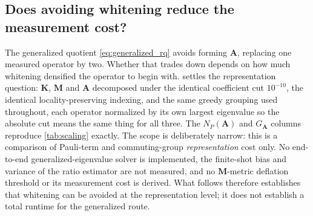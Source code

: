 \documentclass{ieeeaccess}
\newcommand{\M}{\mathbf{M}}
\newcommand{\K}{\mathbf{K}}
\newcommand{\A}{\mathbf{A}}
\begin{document}
\subsection{Does avoiding whitening reduce the measurement cost?}
\label{sec:genquotient}

The generalized quotient \eqref{eq:generalized_rq} avoids forming $\A$, replacing one measured
operator by two. Whether that trades down depends on how much whitening densified the operator
to begin with.  settles the representation question: $\K$, $\M$ and $\A$
decomposed under the identical coefficient cut $10^{-10}$, the identical locality-preserving
indexing, and the same greedy grouping used throughout, each operator normalized by its own
largest eigenvalue so the absolute cut means the same thing for all three. The $N_P(\A)$ and
$G_\A$ columns reproduce \cref{tab:scaling} exactly. The scope is deliberately narrow: this is a
comparison of Pauli-term and commuting-group \emph{representation} cost only. No end-to-end
generalized-eigenvalue solver is implemented, the finite-shot bias and variance of the ratio
estimator are not measured, and no $\M$-metric deflation threshold or its measurement cost is
derived. What follows therefore establishes that whitening can be avoided at the representation
level; it does not establish a total runtime for the generalized route.
\end{document}
